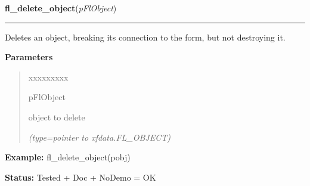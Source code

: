 \hspace{.8\funcindent}\begin{boxedminipage}{\funcwidth}

    \raggedright \textbf{fl\_delete\_object}(\textit{pFlObject})

    \vspace{-1.5ex}

    \rule{\textwidth}{0.5\fboxrule}
\setlength{\parskip}{2ex}
    Deletes an object, breaking its connection to the form, but not 
    destroying it.

\setlength{\parskip}{1ex}
      \textbf{Parameters}
      \vspace{-1ex}

      \begin{quote}
        \begin{Ventry}{xxxxxxxxx}

          \item[pFlObject]

          object to delete

            {\it (type=pointer to xfdata.FL\_OBJECT)}

        \end{Ventry}

      \end{quote}

\textbf{Example:} fl\_delete\_object(pobj)



\textbf{Status:} Tested + Doc + NoDemo = OK



    \end{boxedminipage}

    \label{xformslib:flbasic:fl_get_object_return_state}

    \vspace{0.5ex}

